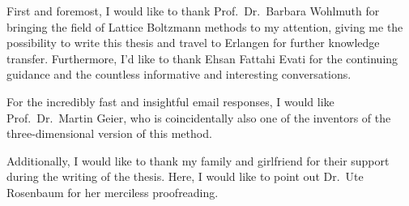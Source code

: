 
First and foremost, I would like to thank Prof.\ Dr.\ Barbara Wohlmuth for bringing the field of Lattice Boltzmann methods to my attention, giving me the possibility to write this thesis and travel to Erlangen for further knowledge transfer.
Furthermore, I'd like to thank Ehsan Fattahi Evati for the continuing guidance and the countless informative and interesting conversations.

For the incredibly fast and insightful email responses, I would like Prof.\ Dr.\ Martin Geier, who is coincidentally also one of the inventors of the three-dimensional version of this method.

Additionally, I would like to thank my family and girlfriend for their support during the writing of the thesis.
Here, I would like to point out Dr.\ Ute Rosenbaum for her merciless proofreading.
